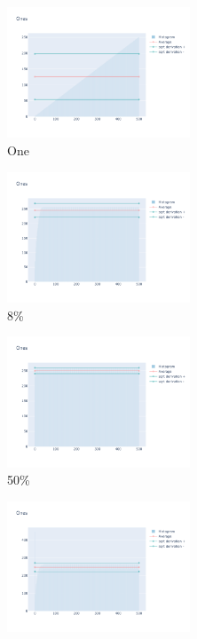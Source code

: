 \documentclass[12pt, fleqn]{report}                             %
\theoremstyle{break}                                            %
\begin{document}
      \begin{figure}[ht!]
        \centering
        \begin{subfigure}[b]{0.4\linewidth}
          \includegraphics[width=0.6\textwidth]{Images/28/dia-a.png}
          \caption{One}
        \end{subfigure}
        \begin{subfigure}[b]{0.4\linewidth}
          \includegraphics[width=0.6\textwidth]{Images/28/dia-b.png}
          \caption{8\%}
        \end{subfigure}
        \begin{subfigure}[b]{0.4\linewidth}
          \includegraphics[width=0.6\textwidth]{Images/28/dia-c.png}
          \caption{50\%}
        \end{subfigure}
        \begin{subfigure}[b]{0.4\linewidth}
          \includegraphics[width=0.6\textwidth]{Images/28/dia-d.png}

\end{subfigure}
\end{figure}
\end{document}
